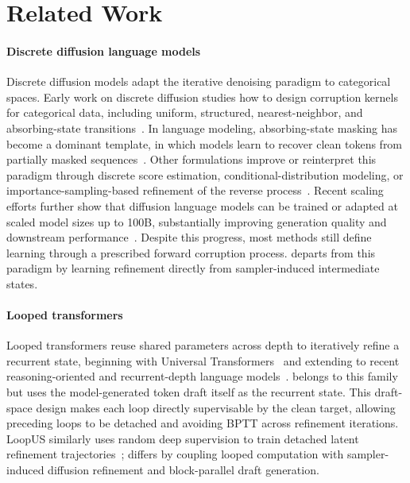 \section{Related Work}

\label{sec:related}
\paragraph{Discrete diffusion language models}
Discrete diffusion models adapt the iterative denoising paradigm to categorical spaces.
Early work on discrete diffusion studies how to design corruption kernels for categorical data, including uniform, structured, nearest-neighbor, and absorbing-state transitions~\citep{D3PM,multinomial_diffusion,ctdd}.
In language modeling, absorbing-state masking has become a dominant template, in which models learn to recover clean tokens from partially masked sequences~\citep{MDLM,MD4}.
Other formulations improve or reinterpret this paradigm through discrete score estimation, conditional-distribution modeling, or importance-sampling-based refinement of the reverse process~\citep{SEDD,MDM_secret,edlm, DFM}.
Recent scaling efforts further show that diffusion language models can be trained or adapted at scaled model sizes up to 100B, substantially improving generation quality and downstream performance~\citep{DiffuLLaMA,llada-moe,LLaDA,dream7b,sdar,dmax,llada20,llada21}.
Despite this progress, most methods still define learning through a prescribed forward corruption process.
\method departs from this paradigm by learning refinement directly from sampler-induced intermediate states.
\vspace{-4pt}

\paragraph{Looped transformers}
Looped transformers reuse shared parameters across depth to iteratively refine a recurrent state, beginning with Universal Transformers~\citep{dehghani2019universal} and extending to recent reasoning-oriented and recurrent-depth language models~\citep{saunshi2025latentthoughts,geiping2025recurrentdepth}.
\method belongs to this family but uses the model-generated token draft itself as the recurrent state.
This draft-space design makes each loop directly supervisable by the clean target, allowing preceding loops to be detached and avoiding BPTT across refinement iterations.
LoopUS similarly uses random deep supervision to train detached latent refinement trajectories~\citep{park2026loopus}; \method differs by coupling looped computation with sampler-induced diffusion refinement and block-parallel draft generation.
\vspace{-4pt}

